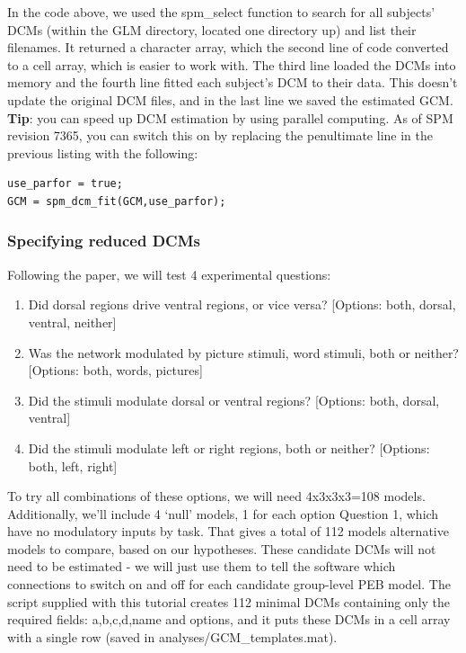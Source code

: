 \documentclass{article}
\begin{document}
In the code above, we used the spm\_select function to search for all subjects' DCMs (within the GLM directory, located one directory up) and list their filenames. It returned a character array, which the second line of code converted to a cell array, which is easier to work with. The third line loaded the DCMs into memory and the fourth line fitted each subject's DCM to their data. This doesn't update the original DCM files, and in the last line we saved the estimated GCM. \\

\textbf{Tip}: you can speed up DCM estimation by using parallel computing. As of SPM revision 7365, you can switch this on by replacing the penultimate line in the previous listing with the following:

\begin{lstlisting}[style=Matlab-editor, caption=Enabling parallel DCM estimation]
use_parfor = true;
GCM = spm_dcm_fit(GCM,use_parfor);

\end{lstlisting}

\subsubsection{Specifying reduced DCMs}
Following the paper, we will test 4 experimental questions:

\begin{enumerate}
    \item Did dorsal regions drive ventral regions, or vice versa? [Options: both, dorsal, ventral, neither]
    \item Was the network modulated by picture stimuli, word stimuli, both or neither?  [Options: both, words, pictures]
    \item Did the stimuli modulate dorsal or ventral regions? [Options: both, dorsal, ventral]
    \item Did the stimuli modulate left or right regions, both or neither? [Options: both, left, right]
\end{enumerate}

To try all combinations of these options, we will need 4x3x3x3=108 models. Additionally, we'll include 4 `null' models, 1 for each option Question 1, which have no modulatory inputs by task. That gives a total of 112 models alternative models to compare, based on our hypotheses. These candidate DCMs will not need to be estimated - we will just use them to tell the software which connections to switch on and off for each candidate group-level PEB model. The script supplied with this tutorial creates 112 minimal DCMs containing only the required fields: a,b,c,d,name and options, and it puts these DCMs in a cell array with a single row (saved in analyses/GCM\_templates.mat).
\end{document}
